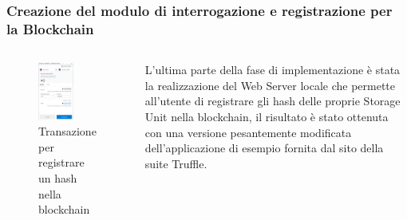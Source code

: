 \documentclass{beamer}
\begin{document}
\begin{frame}
	\frametitle{Creazione del modulo di interrogazione e registrazione per la Blockchain}
	\begin{columns}
		\begin{figure}
			\includegraphics[width=0.6\textwidth]{figures/meta-gui.png}
			\caption{Transazione per registrare un hash nella blockchain}
		\end{figure}
		L’ultima parte della fase di implementazione è stata la realizzazione del Web Server locale che permette all’utente di registrare gli hash delle proprie Storage Unit nella blockchain, il risultato è stato ottenuta con una versione pesantemente modificata dell’applicazione di esempio fornita dal sito della suite Truffle.
	\end{columns}
\end{frame}
\end{document}
